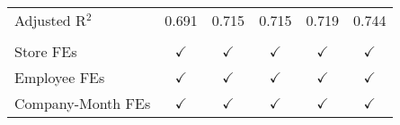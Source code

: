 \begin{tabular}{lccccc}
   Adjusted R$^2$          & 0.691         & 0.715         & 0.715         & 0.719          & 0.744\\  
    \\
   Store FEs               & $\checkmark$  & $\checkmark$  & $\checkmark$  & $\checkmark$   & $\checkmark$\\   
   Employee FEs            & $\checkmark$  & $\checkmark$  & $\checkmark$  & $\checkmark$   & $\checkmark$\\   
   Company-Month FEs       & $\checkmark$  & $\checkmark$  & $\checkmark$  & $\checkmark$   & $\checkmark$\\   
   \bottomrule
\end{tabular}
\par\endgroup


